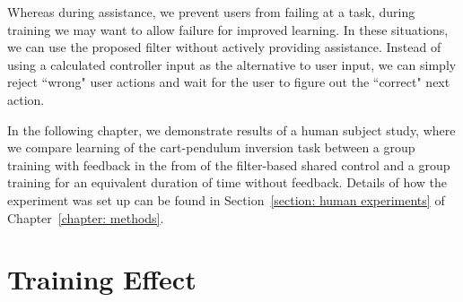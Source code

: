 

Whereas during assistance, we prevent users from failing at a task, during training we may want to allow failure for improved learning. In these situations, we can use the proposed filter without actively providing assistance. Instead of using a calculated controller input as the alternative to user input, we can simply reject ``wrong" user actions and wait for the user to figure out the ``correct" next action. 

In the following chapter, we demonstrate results of a human subject study, where we compare learning of the cart-pendulum inversion task between a group training with feedback in the from of the filter-based shared control and a group training for an equivalent duration of time without feedback. Details of how the experiment was set up can be found in Section~\ref{section: human experiments} of Chapter~\ref{chapter: methods}.

\section{Training Effect}

